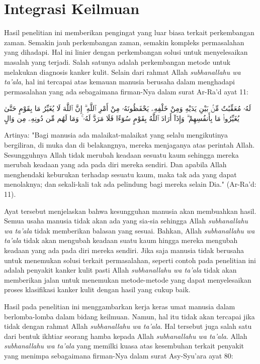 \section{Integrasi Keilmuan}

Hasil penelitian ini memberikan pengingat yang luar biasa terkait perkembangan zaman. Semakin jauh perkembangan zaman, semakin kompleks permasalahan yang dihadapi. Hal ini linier dengan perkembangan solusi untuk menyelesaikan masalah yang terjadi. Salah satunya adalah perkembangan metode untuk melakukan diagnosis kanker kulit. Selain dari rahmat Allah \textit{subhanallahu wa ta'ala}, hal ini tercapai atas kemauan manusia berusaha dalam menghadapi permasalahan yang ada sebagaimana firman-Nya dalam surat Ar-Ra'd ayat 11:

\begin{flushright}
    \begin{RLtext}
        لَهُۥ مُعَقِّبَٰتٌ مِّنۢ بَيْنِ يَدَيْهِ وَمِنْ خَلْفِهِۦ يَحْفَظُونَهُۥ مِنْ أَمْرِ ٱللَّهِ ۗ إِنَّ ٱللَّهَ لَا يُغَيِّرُ مَا بِقَوْمٍ حَتَّىٰ يُغَيِّرُوا۟ مَا بِأَنفُسِهِمْ ۗ وَإِذَآ أَرَادَ ٱللَّهُ بِقَوْمٍ سُوٓءًا فَلَا مَرَدَّ لَهُۥ ۚ وَمَا لَهُم مِّن دُونِهِۦ مِن وَالٍ
    \end{RLtext}
\end{flushright}

Artinya: "Bagi manusia ada malaikat-malaikat yang selalu mengikutinya bergiliran, di muka dan di belakangnya, mereka menjaganya atas perintah Allah. Sesungguhnya Allah tidak merubah keadaan sesuatu kaum sehingga mereka merubah keadaan yang ada pada diri mereka sendiri. Dan apabila Allah menghendaki keburukan terhadap sesuatu kaum, maka tak ada yang dapat menolaknya; dan sekali-kali tak ada pelindung bagi mereka selain Dia." (Ar-Ra'd: 11).

Ayat tersebut menjelaskan bahwa kesungguhan manusia akan membuahkan hasil. Semua usaha manusia tidak akan ada yang sia-sia sehingga Allah \textit{subhanallahu wa ta'ala} tidak memberikan balasan yang sesuai. Bahkan, Allah \textit{subhanallahu wa ta'ala} tidak akan mengubah keadaan suatu kaum hingga mereka mengubah keadaan yang ada pada diri mereka sendiri. Jika saja manusia tidak berusaha untuk menemukan solusi terkait permasalahan, seperti contoh pada penelitian ini adalah penyakit kanker kulit pasti Allah \textit{subhanallahu wa ta'ala} tidak akan memberikan jalan untuk menemukan metode-metode yang dapat menyelesaikan proses klasifikasi kanker kulit dengan hasil yang cukup baik.

Hasil pada penelitian ini menggambarkan kerja keras umat manusia dalam berlomba-lomba dalam bidang keilmuan. Namun, hal itu tidak akan tercapai jika tidak dengan rahmat Allah \textit{subhanallahu wa ta'ala}. Hal tersebut juga salah satu dari bentuk ikhtiar seorang hamba kepada Allah \textit{subhanallahu wa ta'ala}. Allah \textit{subhanallahu wa ta'ala} yang memilki kuasa atas kesembuhan terkait penyakit yang menimpa sebagaimana firman-Nya dalam surat Asy-Syu'ara ayat 80:

